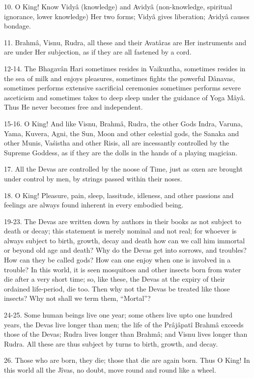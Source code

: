 10. O King! Know Vidy\^a (knowledge) and Avidy\^a (non-knowledge, spiritual ignorance, lower knowledge) Her two forms; Vidy\^a gives liberation; Avidy\^a causes bondage.

11. Brahm\^a, Visnu, Rudra, all these and their Avat\^aras are Her instruments and are under Her subjection, as if they are all fastened by a cord.

12-14. The Bhagav\^an Hari sometimes resides in Vaikuntha, sometimes resides in the sea of milk and enjoys pleasures, sometimes fights the powerful D\^anavas, sometimes performs extensive sacrificial ceremonies sometimes performs severe asceticism and sometimes takes to deep sleep under the guidance of Yoga M\^ay\^a. Thus He never becomes free and independent.

15-16. O King! And like Visnu, Brahm\^a, Rudra, the other Gods Indra, Varuna, Yama, Kuvera, Agni, the Sun, Moon and other celestial gods, the Sanaka and other Munis, Va\'sistha and other Risis, all are incessantly controlled by the Supreme Goddess, as if they are the dolls in the hands of a playing magician.

17. All the Devas are controlled by the noose of Time, just as oxen are brought under control by men, by strings passed within their noses.

18. O King! Pleasure, pain, sleep, lassitude, idleness, and other passions and feelings are always found inherent in every embodied being.

19-23. The Devas are written down by authors in their books as not subject to death or decay; this statement is merely nominal and not real; for whoever is always subject to birth, growth, decay and death how can we call him immortal or beyond old age and death? Why do the Devas get into sorrows, and troubles? How can they be called gods? How can one enjoy when one is involved in a trouble? In this world, it is seen mosquitoes and other insects born from water die after a very short time; so, like these, the Devas at the expiry of their ordained life-period, die too. Then why not the Devas be treated like those insects? Why not shall we term them, ``Mortal''?

24-25. Some human beings live one year; some others live upto one hundred years, the Devas live longer than men; the life of the Pr\^aj\^apat\^i Brahm\^a exceeds those of the Devas; Rudra lives longer than Brahm\^a; and Visnu lives longer than Rudra. All these are thus subject by turns to birth, growth, and decay.

26. Those who are born, they die; those that die are again born. Thus O King! In this world all the J\^ivas, no doubt, move round and round like a wheel.

